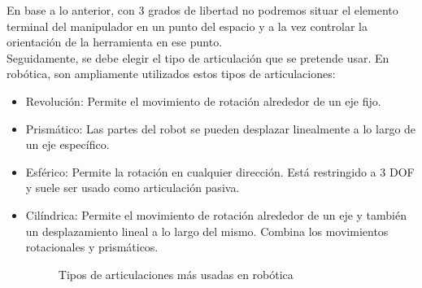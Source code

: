 En base a lo anterior, con 3 grados de libertad no podremos situar el elemento terminal del manipulador en un punto del espacio 
y a la vez controlar la orientación de la herramienta en ese punto.\\

Seguidamente, se debe elegir el tipo de articulación que se pretende usar. En robótica, son ampliamente utilizados estos tipos de 
articulaciones:
\begin{itemize}
\item Revolución: Permite el movimiento de rotación alrededor de un eje fijo.
\item Prismático: Las partes del robot se pueden desplazar linealmente a lo largo de un eje específico. 
\item Esférico: Permite la rotación en cualquier dirección. Está restringido a 3 DOF y suele ser usado como articulación pasiva.
\item Cilíndrica: Permite el movimiento de rotación alrededor de un eje y también un desplazamiento lineal a lo largo del mismo. Combina los movimientos rotacionales y prismáticos. 

\begin{figure} [h!]
  \centering    
  \hspace{1cm}
  \hspace{1cm}
  \caption{Tipos de articulaciones más usadas en robótica}
\end{figure}

\end{itemize}

